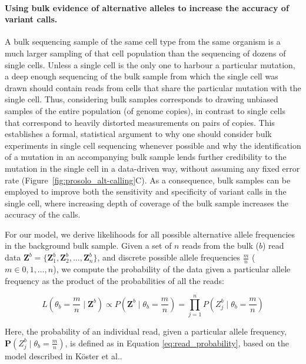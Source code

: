 \documentclass[fleqn,12pt,inline]{wlscirep}
\newcommand{\Prob}{{\mathbf{P}}}
\begin{document}
\paragraph{Using bulk evidence of alternative alleles to increase the accuracy of variant calls.}
A bulk sequencing sample of the same cell type from the same organism is a much larger sampling of that cell population than the sequencing of dozens of single cells.
Unless a single cell is the only one to harbour a particular mutation, a deep enough sequencing of the bulk sample from which the single cell was drawn should contain reads from cells that share the particular mutation with the single cell.
Thus, considering bulk samples corresponds to drawing unbiased samples of the entire population (of genome copies), in contrast to single cells that correspond to heavily distorted measurements on pairs of copies.
This establishes a formal, statistical argument to why one should consider bulk experiments in single cell sequencing whenever possible and why the identification of a mutation in an accompanying bulk sample lends further credibility to the mutation in the single cell in a data-driven way, without assuming any fixed error rate (Figure~\ref{fig:prosolo_alt-calling}C).
As a consequence, bulk samples can be employed to improve both the sensitivity and specificity of variant calls in the single cell, where increasing depth of coverage of the bulk sample increases the accuracy of the calls. 

For our model, we derive likelihoods for all possible alternative allele frequencies in the background bulk sample.
Given a set of $n$ reads from the bulk ($b$) read data $\boldsymbol{Z}^b  = \{ \boldsymbol{Z}_1^b, \boldsymbol{Z}_2^b, \dots, \boldsymbol{Z}_n^b \}$, and discrete possible allele frequencies $\frac{m}{n}$ ($m \in 0, 1, \dots, n$), we compute the probability of the data given a particular allele frequency as the product of the probabilities of all the reads:

\begin{equation}
 \label{eq:bulk-prob}
 L\left(\theta_b = \frac{m}{n} \mid \boldsymbol{Z}^b\right) \propto
 P\left(\boldsymbol{Z}^b \mid \theta_b = \frac{m}{n}\right) =
 \prod_{j=1}^n P\left(Z_j^b \mid \theta_b = \frac{m}{n} \right)
\end{equation}

Here, the probability of an individual read, given a particular allele frequency, $\Prob(Z_j^b \mid \theta_b = \frac{m}{n})$, is defined as in Equation \ref{eq:read_probability}, based on the model described in Köster et al.\cite{koster_enhancing_2019}.
\end{document}
